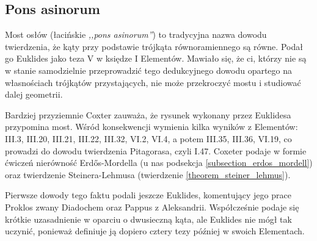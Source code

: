 %


\subsection{Pons asinorum}
Most osłów (łacińskie \emph{,,pons asinorum''}) to tradycyjna nazwa dowodu twierdzenia, że kąty przy podstawie trójkąta równoramiennego są równe.
Podał go Euklides jako teza V w księdze I Elementów.
Mawiało się, że ci, którzy nie są w stanie samodzielnie przeprowadzić tego dedukcyjnego dowodu opartego na własnościach trójkątów przystających, nie może przekroczyć mostu i studiować dalej geometrii.

Bardziej przyziemnie Coxter \cite[s. 6-9]{coxeter_1991} zauważa, że rysunek wykonany przez Euklidesa przypomina most.
Wśród konsekwencji wymienia kilka wyników z Elementów: III.3, III.20, III.21, III.22, III.32, VI.2, VI.4, a potem III.35, III.36, VI.19, co prowadzi do dowodu twierdzenia Pitagorasa, czyli I.47. %
%
Coxeter podaje w formie ćwiczeń nierówność Erdős-Mordella (u nas podsekcja \ref{subsection_erdos_mordell}) oraz twierdzenie Steinera-Lehmusa (twierdzenie \ref{theorem_steiner_lehmus}).

Pierwsze dowody tego faktu podali jeszcze Euklides, komentujący jego prace Proklos zwany Diadochem oraz Pappus z Aleksandrii.
Współcześnie podaje się krótkie uzasadnienie w oparciu o dwusieczną kąta, ale Euklides nie mógł tak uczynić, ponieważ definiuje ją dopiero cztery tezy później w swoich Elementach.



%